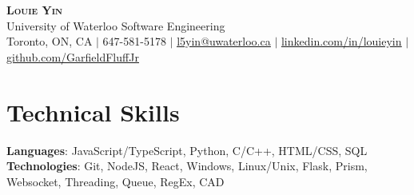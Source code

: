 \documentclass[letterpaper,11pt]{article}
\begin{document}

\begin{center}
    \textbf{\Huge \scshape Louie Yin} \\
    \Large University of Waterloo Software Engineering \\ \vspace{3pt}
    \small Toronto, ON, CA $|$
    \small 647-581-5178 $|$ \href{mailto:l5yin@uwaterloo.ca}{\underline{l5yin@uwaterloo.ca}} $|$ 
    \href{https://www.linkedin.com/in/louieyin/}{\underline{linkedin.com/in/louieyin}} $|$
    \href{https://github.com/GarfieldFluffJr}{\underline{github.com/GarfieldFluffJr}}
\end{center}

\vspace{-12pt}


\section{Technical Skills}
 \begin{itemize}[leftmargin=0.15in, label={}]
    \small{\item{
     \textbf{Languages}{: JavaScript/TypeScript, Python, C/C++, HTML/CSS, SQL} \\
     \textbf{Technologies}{: Git, NodeJS, React, Windows, Linux/Unix, Flask, Prism, Websocket, Threading, Queue, RegEx, CAD} \\
     \textbf{}
    }}
 \end{itemize}

 \vspace{-22pt}



\end{document}
